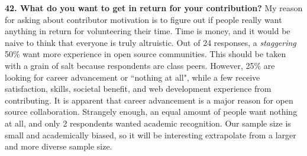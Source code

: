{\bf 42. What do you want to get in return for your contribution?} My reason for asking about contributor motivation is to figure out if people really want anything in return for volunteering their time. Time is money, and it would be naive to think that everyone is truly altruistic. Out of 24 responses, a {\it staggering} 50\% want more experience in open source communities. This should be taken with a grain of salt because respondents are class peers. However, 25\% are looking for career advancement or ``nothing at all", while a few receive satisfaction, skills, societal benefit, and web development experience from contributing. It is apparent that career advancement is a major reason for open source collaboration. Strangely enough, an equal amount of people want nothing at all, and only 2 respondents wanted academic recognition. Our sample size is small and academically biased, so it will be interesting extrapolate from a larger and more diverse sample size.
